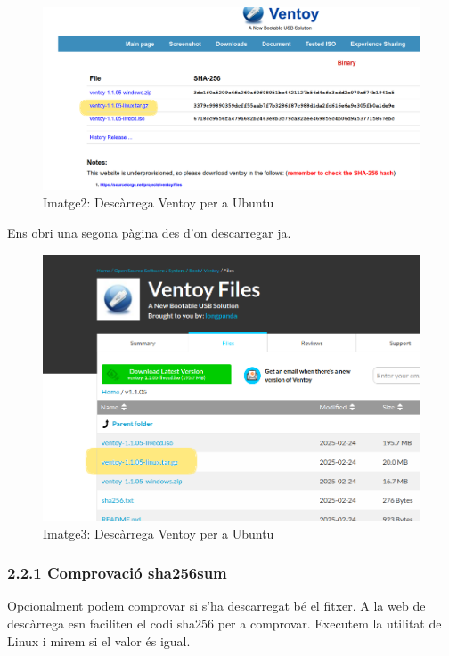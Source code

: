 \documentclass[
  12 pt,
  a4paper,
]{article}
\begin{document}
\begin{figure}
\centering
\includegraphics{png/descarrega1.png}
\caption{Imatge2: Descàrrega Ventoy per a Ubuntu}
\end{figure}

Ens obri una segona pàgina des d'on descarregar ja.

\begin{figure}
\centering
\includegraphics{png/descarrega2.png}
\caption{Imatge3: Descàrrega Ventoy per a Ubuntu}
\end{figure}

\subsubsection{2.2.1 Comprovació
sha256sum}\label{comprovaciuxf3-sha256sum}

Opcionalment podem comprovar si s'ha descarregat bé el fitxer. A la web
de descàrrega esn faciliten el codi sha256 per a comprovar. Executem la
utilitat de Linux i mirem si el valor és igual.
\end{document}
